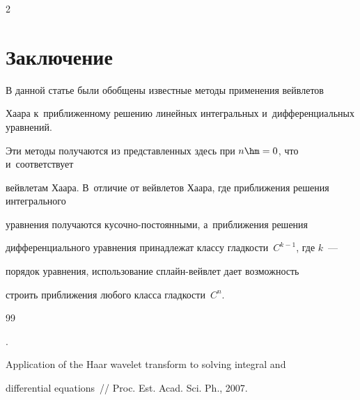 \begin{multicols}{2}
\section{Заключение}





\vspace*{-2pt}





В данной статье были обобщены известные методы применения вейвлетов 


Хаара к~приближенному решению линейных интегральных и~дифференциальных уравнений. 


Эти методы получаются из представленных здесь при $n\hm=0$, что и~соответствует 


вейвлетам Хаара. В~отличие от вейвлетов Хаара, где приближения решения интегрального 


уравнения получаются ку\-соч\-но-по\-сто\-ян\-ны\-ми, а~приближения решения 


дифференциального уравнения принадлежат классу глад\-кости~$C^{k-1}$, где $k$~--- 


порядок уравнения, использование сплайн-вейв\-лет дает возможность 


строить приближения любого класса гладкости~$C^n$.





\vspace*{-6pt}





{\small\frenchspacing


 {%




 \begin{thebibliography}{99}


 


 \vspace*{-2pt}


 




. 


Application of the Haar wavelet transform to solving integral and 


differential equations~// Proc. Est. Acad. Sci. Ph.,  2007. 



\end{thebibliography}}}
\end{multicols}
